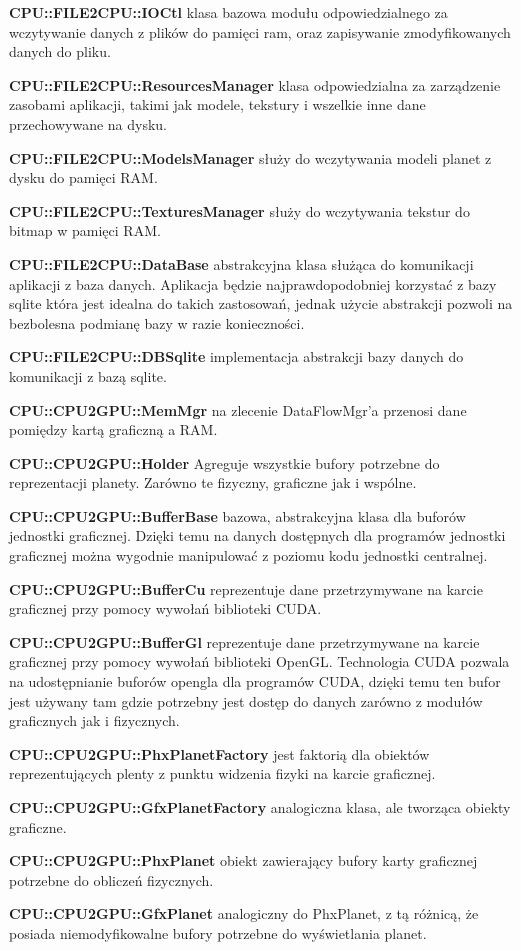\begin{description}
\item{}
\item{\bf CPU::FILE2CPU::IOCtl} klasa bazowa modułu odpowiedzialnego za wczytywanie danych z plików do pamięci ram, oraz zapisywanie zmodyfikowanych danych do pliku.
\item{\bf CPU::FILE2CPU::ResourcesManager} klasa odpowiedzialna za zarządzenie zasobami aplikacji, takimi jak modele, tekstury i wszelkie inne dane przechowywane na dysku.
\item{\bf CPU::FILE2CPU::ModelsManager} służy do wczytywania modeli planet z dysku do pamięci RAM.
\item{\bf CPU::FILE2CPU::TexturesManager} służy do wczytywania tekstur do bitmap w pamięci RAM.
\item{\bf CPU::FILE2CPU::DataBase} abstrakcyjna klasa służąca do komunikacji aplikacji z baza danych. Aplikacja będzie najprawdopodobniej korzystać z bazy sqlite która jest idealna do takich zastosowań, jednak użycie abstrakcji pozwoli na bezbolesna podmianę bazy w razie konieczności.
\item{\bf CPU::FILE2CPU::DBSqlite} implementacja abstrakcji bazy danych do komunikacji z bazą sqlite.
\item{}
\item{\bf CPU::CPU2GPU::MemMgr} na zlecenie DataFlowMgr'a przenosi dane pomiędzy kartą graficzną a RAM.
\item{\bf CPU::CPU2GPU::Holder} Agreguje wszystkie bufory potrzebne do reprezentacji planety. Zarówno te fizyczny, graficzne jak i wspólne.
\item{\bf CPU::CPU2GPU::BufferBase} bazowa, abstrakcyjna klasa dla buforów jednostki graficznej. Dzięki temu na danych dostępnych dla programów jednostki graficznej można wygodnie manipulować z poziomu kodu jednostki centralnej.
\item{\bf CPU::CPU2GPU::BufferCu} reprezentuje dane przetrzymywane na karcie graficznej przy pomocy wywołań biblioteki CUDA.
\item{\bf CPU::CPU2GPU::BufferGl} reprezentuje dane przetrzymywane na karcie graficznej przy pomocy wywołań biblioteki OpenGL. Technologia CUDA pozwala na udostępnianie buforów opengla dla programów CUDA, dzięki temu ten bufor jest używany tam gdzie potrzebny jest dostęp do danych zarówno z modułów graficznych jak i fizycznych.
\item{\bf CPU::CPU2GPU::PhxPlanetFactory} jest faktorią dla obiektów reprezentujących plenty z punktu widzenia fizyki na karcie graficznej.
\item{\bf CPU::CPU2GPU::GfxPlanetFactory} analogiczna klasa, ale tworząca obiekty graficzne.
\item{\bf CPU::CPU2GPU::PhxPlanet} obiekt zawierający bufory karty graficznej potrzebne do obliczeń fizycznych.
\item{\bf CPU::CPU2GPU::GfxPlanet} analogiczny do PhxPlanet, z tą różnicą, że posiada niemodyfikowalne bufory potrzebne do wyświetlania planet.
\end{description}

